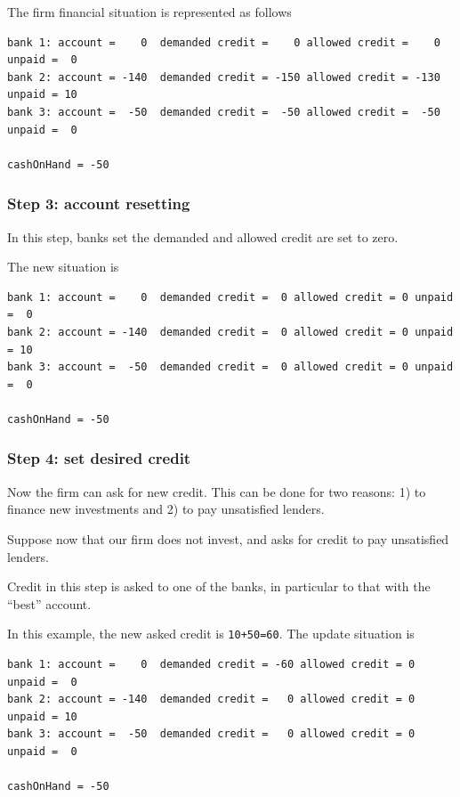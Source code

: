 \documentclass{article}
\begin{document}
The firm financial situation is represented as follows

\begin{verbatim}
bank 1: account =    0  demanded credit =    0 allowed credit =    0 unpaid =  0
bank 2: account = -140  demanded credit = -150 allowed credit = -130 unpaid = 10
bank 3: account =  -50  demanded credit =  -50 allowed credit =  -50 unpaid =  0

cashOnHand = -50
\end{verbatim}

\subsubsection*{Step 3: account resetting}
In this step, banks set the demanded and allowed credit are set to zero.

The new situation is

\begin{verbatim}
bank 1: account =    0  demanded credit =  0 allowed credit = 0 unpaid =  0
bank 2: account = -140  demanded credit =  0 allowed credit = 0 unpaid = 10
bank 3: account =  -50  demanded credit =  0 allowed credit = 0 unpaid =  0

cashOnHand = -50
\end{verbatim}



\subsubsection*{Step 4: set desired credit}

Now the firm can ask for new credit. This can be done for two reasons: 1) to finance new investments and 2) to pay unsatisfied lenders.

Suppose now that our firm does not invest, and asks for credit to pay unsatisfied lenders.

Credit in this step is asked to one of the banks, in particular to that with the ``best'' account.

In this example, the new asked credit is \verb/10+50=60/. The update situation is 

\begin{verbatim}
bank 1: account =    0  demanded credit = -60 allowed credit = 0 unpaid =  0
bank 2: account = -140  demanded credit =   0 allowed credit = 0 unpaid = 10
bank 3: account =  -50  demanded credit =   0 allowed credit = 0 unpaid =  0

cashOnHand = -50
\end{verbatim}
\end{document}
